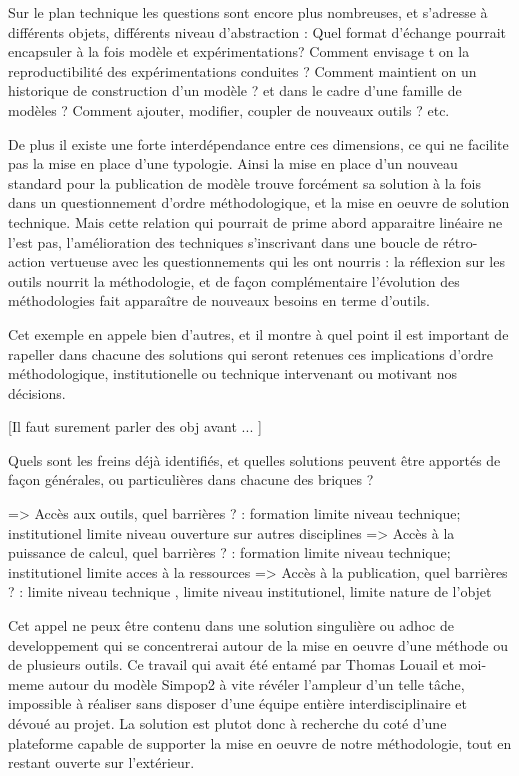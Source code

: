 Sur le plan technique les questions sont encore plus nombreuses, et s'adresse à différents objets, différents niveau d'abstraction : Quel format d'échange pourrait encapsuler à la fois modèle et expérimentations? Comment envisage t on la reproductibilité des expérimentations conduites ? Comment maintient on un historique de construction d'un modèle ? et dans le cadre d'une famille de modèles ? Comment ajouter, modifier, coupler de nouveaux outils ? etc.  

De plus il existe une forte interdépendance entre ces dimensions, ce qui ne facilite pas la mise en place d'une typologie. Ainsi la mise en place d'un nouveau standard pour la publication de modèle trouve forcément sa solution à la fois dans un questionnement d'ordre méthodologique, et la mise en oeuvre de solution technique. Mais cette relation qui pourrait de prime abord apparaitre linéaire ne l'est pas, l'amélioration des techniques s'inscrivant dans une boucle de rétro-action vertueuse avec les questionnements qui les ont nourris :  la réflexion sur les outils nourrit la méthodologie, et de façon complémentaire l'évolution des méthodologies fait apparaître de nouveaux besoins en terme d'outils.

Cet exemple en appele bien d'autres, et il montre à quel point il est important de rapeller dans chacune des solutions qui seront retenues ces implications d'ordre méthodologique, institutionelle ou technique intervenant ou motivant nos décisions.

[Il faut surement parler des obj avant ... ]

Quels sont les freins déjà identifiés,  et quelles solutions peuvent être apportés de façon générales, ou particulières dans chacune des briques ?

=> Accès aux outils, quel barrières ? : formation limite niveau technique; institutionel limite niveau ouverture sur autres disciplines
=> Accès à la puissance de calcul, quel barrières ? : formation limite niveau technique; institutionel limite acces à la ressources 
=> Accès à la publication, quel barrières ? : limite niveau technique , limite niveau institutionel, limite nature de l'objet 

Cet appel ne peux être contenu dans une solution singulière ou adhoc de developpement qui se concentrerai autour de la mise en oeuvre d'une méthode ou de plusieurs outils. Ce travail qui avait été entamé par Thomas Louail et moi-meme autour du modèle Simpop2 à vite révéler l'ampleur d'un telle tâche, impossible à réaliser sans disposer d'une équipe entière interdisciplinaire et dévoué au projet. La solution est plutot donc à recherche du coté d'une plateforme capable de supporter la mise en oeuvre de notre méthodologie, tout en restant ouverte sur l'extérieur. 

